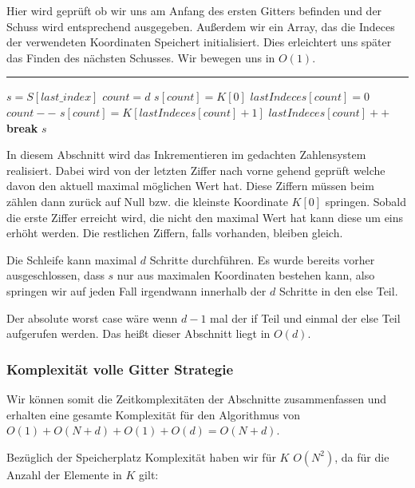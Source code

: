 \documentclass[a4paper,12pt]{llncs}
\numberwithin{equation}{section}
\begin{document}
Hier wird geprüft ob wir uns am Anfang des ersten Gitters befinden und der Schuss wird entsprechend ausgegeben. Außerdem wir ein Array, das die Indeces der verwendeten Koordinaten Speichert initialisiert. Dies erleichtert uns später das Finden des nächsten Schusses. Wir bewegen uns in $O(1)$.

\smallskip
\hrule
\smallskip

\begin{tcolorbox}
	\begin{algorithmic}
		\State $s=S[last\_index]$
		\State $count =d$
		\State $s[count]=K[0]$
		\State $lastIndeces[count]=0$
		\State $count--$
		\Else
		\State $s[count] = K[lastIndeces[count]+1]$
		\State $lastIndeces[count]++$
		\State\textbf{break}
		\State\Return $s$
		\EndIf
		\EndWhile
		\EndFunction
	\end{algorithmic}
\end{tcolorbox}

In diesem Abschnitt wird das Inkrementieren im gedachten Zahlensystem realisiert. Dabei wird von der letzten Ziffer nach vorne gehend geprüft welche davon den aktuell maximal möglichen Wert hat. Diese Ziffern müssen beim zählen dann zurück auf Null bzw. die kleinste Koordinate $K[0]$ springen. Sobald die erste Ziffer erreicht wird, die nicht den maximal Wert hat kann diese um eins erhöht werden. Die restlichen Ziffern, falls vorhanden, bleiben gleich. 

Die Schleife kann maximal $d$ Schritte durchführen. Es wurde bereits vorher ausgeschlossen, dass $s$ nur aus maximalen Koordinaten bestehen kann, also springen wir auf jeden Fall irgendwann innerhalb der $d$ Schritte in den else Teil. 

Der absolute worst case wäre wenn $d-1$ mal der if Teil und einmal der else Teil aufgerufen werden. Das heißt dieser Abschnitt liegt in $O(d)$.

\subsubsection{Komplexität volle Gitter Strategie}

Wir können somit die Zeitkomplexitäten der Abschnitte zusammenfassen und erhalten eine gesamte Komplexität für den Algorithmus von $O(1)+O(N+d)+O(1)+O(d)=O(N+d)$.


Bezüglich der Speicherplatz Komplexität haben wir für $K$ $O(N^2)$, da für die Anzahl der Elemente in $K$ gilt:
\end{document}
